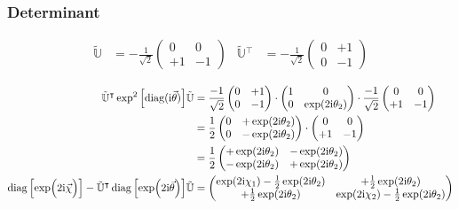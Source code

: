 \documentclass[
	english,
	a4paper,
	fontsize=10pt,
	parskip=half,
	titlepage=true,
	DIV=12,
	final
]{scrreprt}
\newcommand*{\transp}{\ensuremath{^\intercal}}
\newcommand*{\iunit}{\ensuremath{\mathrm{i}}}
\DeclareMathOperator{\diag}{diag}
\begin{document}
\subsubsection{Determinant}
\begin{align}
	\tilde{\mathbb{U}}
&=
	-\frac{1}{\sqrt{2}}
	\begin{pmatrix}
		 0 &  0 \\
		+1 & -1
	\end{pmatrix}
&
	\tilde{\mathbb{U}}\transp
&=
	-\frac{1}{\sqrt{2}}
	\begin{pmatrix}
		0 & +1 \\
		0 & -1
	\end{pmatrix}
\end{align}

\begin{align}
	\tilde{\mathbb{U}}\transp
	\exp^2\qty[\diag(\iunit\vec{\theta})]
	\tilde{\mathbb{U}}
&=
	\frac{-1}{\sqrt{2}}
	\begin{pmatrix}
		0 & +1 \\
		0 & -1
	\end{pmatrix}
	\cdot
	\begin{pmatrix}
		1 & 0 \\
		0 & \exp(2\iunit \theta_2)
	\end{pmatrix}
	\cdot
	\frac{-1}{\sqrt{2}}
	\begin{pmatrix}
		 0 &  0 \\
		+1 & -1
	\end{pmatrix} \\
&=
	\frac{1}{2}
	\begin{pmatrix}
		0 & +\exp(2\iunit \theta_2) \\
		0 & -\exp(2\iunit \theta_2)
	\end{pmatrix}
	\cdot
	\begin{pmatrix}
		 0 &  0 \\
		+1 & -1
	\end{pmatrix} \\
&=
	\frac{1}{2}
	\begin{pmatrix}
		+\exp(2\iunit \theta_2)	&	-\exp(2\iunit \theta_2) \\
		-\exp(2\iunit \theta_2)	&	+\exp(2\iunit \theta_2)
	\end{pmatrix}
\\
	\diag\qty[\exp(\Big.2\iunit\vec{\chi})]
	-
	\tilde{\mathbb{U}}\transp
	\diag\qty[\exp(2\iunit\vec{\theta})]
	\tilde{\mathbb{U}}
&=
	\begin{pmatrix}
		\exp(2\iunit \chi_1) - \frac{1}{2}\exp(2\iunit \theta_2)	&
		+\frac{1}{2}\exp(2\iunit \theta_2)
		\\
		+\frac{1}{2}\exp(2\iunit \theta_2)	&
		\exp(2\iunit \chi_2) - \frac{1}{2}\exp(2\iunit \theta_2)
	\end{pmatrix}
\end{align}
\end{document}
